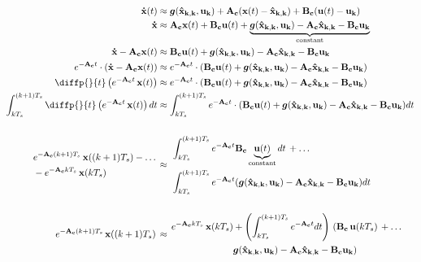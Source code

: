 \documentclass[12pt]{article}
\begin{document}
\begin{equation*}
\begin{aligned}
    \mathbf{\dot{x}}(t) &\approx \boldsymbol{g}(\mathbf{\hat{x}_{k, k}}, \mathbf{u_k}) + \mathbf{A_c}(\mathbf{x}(t) - \mathbf{\hat{x}_{k, k}}) + \mathbf{B_c} (\mathbf{u}(t) - \mathbf{u_k})\\
    \mathbf{\dot{x}} &\approx \mathbf{A_c}\mathbf{x}(t) + \mathbf{B_c} \mathbf{u}(t) + \underbrace{\boldsymbol{g}(\mathbf{\hat{x}_{k, k}}, \mathbf{u_k}) - \mathbf{A_c \hat{x}_{k,k} - B_c u_k}}_{\text{constant}} \\
    \mathbf{\dot{x}} - \mathbf{A_c}\mathbf{x}(t) &\approx \mathbf{B_c} \mathbf{u}(t) + \boldsymbol{g}(\mathbf{\hat{x}_{k, k}}, \mathbf{u_k}) - \mathbf{A_c \hat{x}_{k,k} - B_c u_k}\\
    e^{\mathbf{-A_c} t} \cdot (\mathbf{\dot{x}} - \mathbf{A_c}\mathbf{x}(t)) &\approx e^{\mathbf{-A_c} t} \cdot (\mathbf{B_c} \mathbf{u}(t) + \boldsymbol{g}(\mathbf{\hat{x}_{k, k}}, \mathbf{u_k}) - \mathbf{A_c \hat{x}_{k,k} - B_c u_k}) \\
    \diffp{}{t} \left(e^{\mathbf{-A_c} t}\,\mathbf{x}(t) \right) &\approx e^{\mathbf{-A_c} t} \cdot (\mathbf{B_c} \mathbf{u}(t) + \boldsymbol{g}(\mathbf{\hat{x}_{k, k}}, \mathbf{u_k}) - \mathbf{A_c \hat{x}_{k,k} - B_c u_k}) \\
    \int_{kT_s}^{(k+1)T_s} \diffp{}{t} \left(e^{\mathbf{-A_c} t}\,\mathbf{x}(t) \right) dt &\approx \int_{kT_s}^{(k+1)T_s} e^{\mathbf{-A_c} t} \cdot (\mathbf{B_c} \mathbf{u}(t) + \boldsymbol{g}(\mathbf{\hat{x}_{k, k}}, \mathbf{u_k}) - \mathbf{A_c \hat{x}_{k,k} - B_c u_k}) dt \\
    \\
    \begin{aligned}
        & e^{\mathbf{-A_c} (k+1)T_s} \, \mathbf{x}((k+1)T_s) - \dots \\ 
        & - e^{\mathbf{-A_c}kT_s} \, \mathbf{x}(kT_s)
    \end{aligned} \, &\approx \, \begin{aligned}
    &\int_{kT_s}^{(k+1)T_s} e^{\mathbf{-A_c} t} \mathbf{B_c} \underbrace{\mathbf{u}(t)}_{\text{constant}}dt \,+ \dots \, \\ &\int_{kT_s}^{(k+1)T_s} e^{\mathbf{-A_c} t} (\boldsymbol{g}(\mathbf{\hat{x}_{k, k}}, \mathbf{u_k}) - \mathbf{A_c \hat{x}_{k,k} - B_c u_k})dt \end{aligned} \\
    \\
    e^{\mathbf{-A_c} (k+1)T_s} \, \mathbf{x}((k+1)T_s) \, &\approx \, 
    \begin{aligned}
         e^{\mathbf{-A_c}kT_s} \, \mathbf{x}(kT_s) & + \left(\int_{kT_s}^{(k+1)T_s} e^{\mathbf{-A_c} t} dt \right) \, ( \mathbf{B_c}\,\mathbf{u}(kT_s) \,+ \dots\\ 
        &\boldsymbol{g}(\mathbf{\hat{x}_{k, k}}, \mathbf{u_k}) - \mathbf{A_c \hat{x}_{k,k} - B_c u_k} ) \end{aligned} \\
\end{aligned}
\end{equation*}
\end{document}

